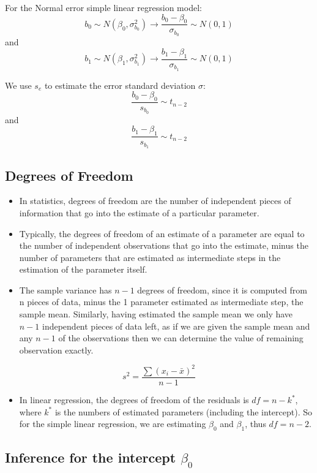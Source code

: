 \documentclass[
]{article}
\providecommand{\tightlist}{%
  \setlength{\itemsep}{0pt}\setlength{\parskip}{0pt}}
\begin{document}
For the Normal error simple linear regression model:
\[b_0\sim N(\beta_0,\sigma^2_{b_0}) \rightarrow 
\frac{b_0-\beta_0}{\sigma_{b_0}}\sim N(0,1)\] and
\[b_1\sim N(\beta_1,\sigma^2_{b_1}) \rightarrow
\frac{b_1-\beta_1}{\sigma_{b_1}}\sim N(0,1)\]

We use \(s_e\) to estimate the error standard deviation \(\sigma\):
\[\frac{b_0-\beta_0}{s_{b_0}}\sim t_{n-2}\] and
\[\frac{b_1-\beta_1}{s_{b_1}}\sim t_{n-2}\]

\hypertarget{degrees-of-freedom}{%
\subsection{Degrees of Freedom}\label{degrees-of-freedom}}

\begin{itemize}
\item
  In statistics, degrees of freedom are the number of independent pieces
  of information that go into the estimate of a particular parameter.
\item
  Typically, the degrees of freedom of an estimate of a parameter are
  equal to the number of independent observations that go into the
  estimate, minus the number of parameters that are estimated as
  intermediate steps in the estimation of the parameter itself.
\item
  The sample variance has \(n - 1\) degrees of freedom, since it is
  computed from n pieces of data, minus the 1 parameter estimated as
  intermediate step, the sample mean. Similarly, having estimated the
  sample mean we only have \(n - 1\) independent pieces of data left, as
  if we are given the sample mean and any \(n - 1\) of the observations
  then we can determine the value of remaining observation exactly.
\end{itemize}

\[s^2=\frac{\sum(x_i-\bar{x})^2}{n-1}\]

\begin{itemize}
\tightlist
\item
  In linear regression, the degrees of freedom of the residuals is
  \(df=n-k^*\), where \(k^*\) is the numbers of estimated parameters
  (including the intercept). So for the simple linear regression, we are
  estimating \(\beta_0\) and \(\beta_1\), thus \(df=n-2\).
\end{itemize}

\hypertarget{inference-for-the-intercept-beta_0}{%
\subsection{\texorpdfstring{Inference for the intercept
\(\beta_0\)}{Inference for the intercept \textbackslash beta\_0}}\label{inference-for-the-intercept-beta_0}}
\end{document}
